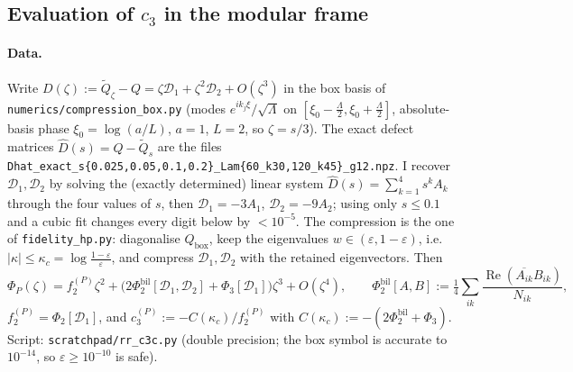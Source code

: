 \documentclass[11pt]{article}
\newcommand{\abs}[1]{\lvert#1\rvert}
\begin{document}
\subsection{Evaluation of $c_3$ in the modular frame}\label{sec:c3eval}

\paragraph{Data.}  Write $D(\zeta):=\widetilde Q_\zeta-Q=\zeta\mathcal D_1+\zeta^2\mathcal D_2+O(\zeta^3)$ in the box basis
of \texttt{numerics/compression\_box.py} (modes $e^{ik_j\xi}/\sqrt\Lambda$ on
$[\xi_0-\frac\Lambda2,\xi_0+\frac\Lambda2]$, absolute-basis phase $\xi_0=\log(a/L)$, $a=1$, $L=2$,
so $\zeta=s/3$).  The exact defect matrices $\widehat D(s)=Q-\widetilde Q_s$ are the files
\texttt{Dhat\_exact\_s\{0.025,0.05,0.1,0.2\}\_Lam\{60\_k30,120\_k45\}\_g12.npz}.  I recover
$\mathcal D_1,\mathcal D_2$ by solving the (exactly determined) linear system
$\widehat D(s)=\sum_{k=1}^4s^kA_k$ through the four values of $s$, then $\mathcal D_1=-3A_1$,
$\mathcal D_2=-9A_2$; using only $s\le0.1$ and a cubic fit changes every digit below by $<10^{-5}$.
The compression is the one of \texttt{fidelity\_hp.py}: diagonalise $Q_{\mathrm{box}}$, keep the
eigenvalues $w\in(\varepsilon,1-\varepsilon)$, i.e.\ $\abs\kappa\le\kappa_c=\log\frac{1-\varepsilon}
\varepsilon$, and compress $\mathcal D_1,\mathcal D_2$ with the retained eigenvectors.  Then
\begin{equation}\label{eq:c3split}
 \Phi_P(\zeta)=f_2^{(P)}\zeta^2+\bigl(2\Phi_2^{\mathrm{bil}}[\mathcal D_1,\mathcal D_2]+\Phi_3[\mathcal D_1]\bigr)\zeta^3
 +O(\zeta^4),\qquad
 \Phi_2^{\mathrm{bil}}[A,B]:=\tfrac14\sum_{ik}\frac{\operatorname{Re}(\overline{A_{ik}}B_{ik})}{N_{ik}},
\end{equation}
$f_2^{(P)}=\Phi_2[\mathcal D_1]$, and $c_3^{(P)}:=-C(\kappa_c)/f_2^{(P)}$ with
$C(\kappa_c):=-(2\Phi_2^{\mathrm{bil}}+\Phi_3)$.  Script:
\texttt{scratchpad/rr\_c3c.py} (double precision; the box symbol is accurate to $10^{-14}$, so
$\varepsilon\ge10^{-10}$ is safe).
\end{document}

